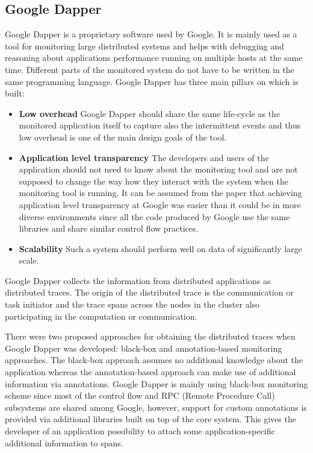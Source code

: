 \subsection{Google Dapper}
\label{dapper}
Google Dapper \cite{DapperPaper} is a proprietary software used by Google. It is mainly used as a tool for monitoring large distributed systems and helps with debugging and reasoning about applications performance running on multiple hosts at the same time. Different parts of the monitored system do not have to be written in the same programming language. Google Dapper has three main pillars on which is built:
\begin{itemize}
	\item \textbf{Low overhead} \newline
	Google Dapper should share the same life-cycle as the monitored application itself to capture also the intermittent events and thus low overhead is one of the main design goals of the tool.
	\item \textbf{Application level transparency} \newline
	The developers and users of the application should not need to know about the monitoring tool and are not supposed to change the way how they interact with the system when the monitoring tool is running. It can be assumed from the paper that achieving application level transparency at Google was easier than it could be in more diverse environments since all the code produced by Google use the same libraries and share similar control flow practices.
	\item \textbf{Scalability} \newline
	Such a system should perform well on data of significantly large scale.
\end{itemize}	
Google Dapper collects the information from distributed applications as distributed traces. The origin of the distributed trace is the communication or task initiator and the trace spans across the nodes in the cluster also participating in the computation or communication.
	
There were two proposed approaches for obtaining the distributed traces when Google Dapper was developed: black-box and annotation-based monitoring approaches. The black-box approach assumes no additional knowledge about the application whereas the annotation-based approach can make use of additional information via annotations. Google Dapper is mainly using black-box monitoring scheme since most of the control flow and RPC (Remote Procedure Call) subsystems are shared among Google, however, support for custom annotations is provided via additional libraries built on top of the core system. This gives the developer of an application possibility to attach some application-specific additional information to spans.
	
